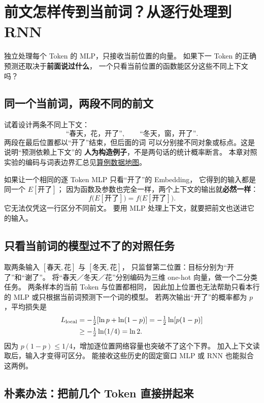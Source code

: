 \chapterrule
\section{前文怎样传到当前词？从逐行处理到 RNN}
\label{intro:21a-context-gap}
\label{intro:21-rnn}

独立处理每个 Token 的 MLP，只接收当前位置的向量。
如果下一 Token 的正确预测还取决于\textbf{前面说过什么}，
一个只看当前位置的函数能区分这些不同上下文吗？

\subsection{同一个当前词，两段不同的前文}
\label{partq:context}

试着设计两条不同上下文：
\[
\text{“春天，花，开了”},\qquad
\text{“冬天，窗，开了”}.
\]
两段在最后位置都以“开了”结束，但后面的词
可以分别接不同对象或标点。这是说明“预测依赖上下文”的
\textbf{人为构造例子}，不是两句话的统计概率断言。
本章对照实验的编码与词表边界汇总见\hyperref[app:data-map]{算例数据地图}。

如果让一个相同的逐 Token MLP 只看“开了”的 Embedding，
它得到的输入都是同一个 $E[\text{开了}]$；
因为函数及参数也完全一样，两个上下文的输出就\textbf{必然一样}：
\[
f\bigl(E[\text{开了}]\bigr)
=f\bigl(E[\text{开了}]\bigr).
\]
它无法仅凭这一行区分不同前文。
要用 MLP 处理上下文，就要把前文也送进它的输入。

\subsection{只看当前词的模型过不了的对照任务}
\label{experiment:context-contrast}
取两条输入 $[\text{春天},\text{花}]$ 与 $[\text{冬天},\text{花}]$，
只监督第二位置：目标分别为“开了”和“谢了”。
将“春天／冬天／花”分别编码为三维 one-hot 向量，做一个二分类任务。
两条样本的当前 Token 与位置都相同，
因此加上位置也无法帮助只看本行的 MLP 或只根据当前词预测下一个词的模型。
若两次输出“开了”的概率都为 $p$，平均损失是
\[
\begin{aligned}
L_{\rm local}&=-\tfrac12[\ln p+\ln(1-p)]
=-\tfrac12\ln[p(1-p)]\\
&\geq-\tfrac12\ln(1/4)=\ln2.
\end{aligned}
\]
因为 $p(1-p)\leq1/4$，增加逐位置网络容量也突破不了这个下界。
加入上下文读取后，输入才变得可区分。
能接收这些历史的固定窗口 MLP 或 RNN 也能拟合这两例。
\subsection{朴素办法：把前几个 Token 直接拼起来}

